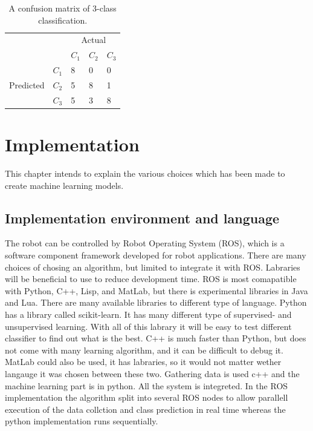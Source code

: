 \documentclass[USenglish]{ifimaster}  %
\begin{document}
\begin{table}[h]
\centering
\begin{tabular}{ll|l|l|l|}
\cline{3-5}
 &  & \multicolumn{3}{c|}{Actual} \\ \cline{3-5} 
 &  & $C_1$ & $C_2$ & $C_3$ \\ \hline
\multicolumn{1}{|l|}{\multirow{3}{*}{Predicted}} & $C_1$ & 8 & 0 & 0 \\ \cline{2-5} 
\multicolumn{1}{|l|}{} & $C_2$ & 5 & 8 & 1 \\ \cline{2-5} 
\multicolumn{1}{|l|}{} & $C_3$ & 5 & 3 & 8 \\ \hline
\end{tabular}
\caption{A confusion matrix of 3-class classification.}
\label{tab:cmatrix}
\end{table}

\chapter{Implementation}        %
This chapter intends to explain the various choices which has been made to create machine learning models.


\section{Implementation environment and language}
The robot can be controlled by Robot Operating System (ROS), which is a software component framework developed for robot applications. There are many choices of chosing an algorithm, but limited to integrate it with ROS. Labraries will be beneficial to use to reduce development time. ROS is most comapatible with Python, C++, Lisp, and MatLab, but there is experimental libraries in Java and Lua. 
There are many available libraries to different type of language. Python has a library called scikit-learn. It has many different type of supervised- and unsupervised learning. With all of this labrary it will be easy to test different classifier to find out what is the best. C++ is much faster than Python, but does not come with many learning algorithm, and it can be difficult to debug it. MatLab could also be used, it has labraries, so it would not matter wether langauge it was chosen between these two. Gathering data is used c++ and the machine learning part is in python. All the system is integreted. In the ROS implementation the algorithm split into several ROS nodes to allow parallell execution of the data collction and class prediction in real time whereas the python implementation runs sequentially.
\end{document}
